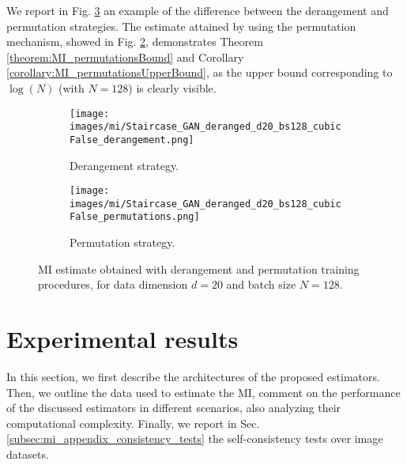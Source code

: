 We report in Fig. \ref{fig:MI_derangementVsPermutation} an example of the difference between the derangement and permutation strategies. The estimate attained by using the permutation mechanism, showed in Fig. \ref{fig:MI_permutations}, demonstrates Theorem \ref{theorem:MI_permutationsBound} and Corollary \ref{corollary:MI_permutationsUpperBound}, as the upper bound corresponding to $\log(N)$ (with $N=128$) is clearly visible. 

\begin{figure}
\centering
\begin{subfigure}{0.5\textwidth}
  \centering
  \texttt{[image: images/mi/Staircase\_GAN\_deranged\_d20\_bs128\_cubicFalse\_derangement.png]}
  \caption{Derangement strategy.}
  \label{fig:MI_derangement}
\end{subfigure}%
\begin{subfigure}{0.5\textwidth}
  \centering
  \texttt{[image: images/mi/Staircase\_GAN\_deranged\_d20\_bs128\_cubicFalse\_permutations.png]}
  \caption{Permutation strategy.}
  \label{fig:MI_permutations}
\end{subfigure}
\caption{MI estimate obtained with derangement and permutation training procedures, for data dimension $d=20$ and batch size $N=128$.}
\label{fig:MI_derangementVsPermutation}
\end{figure}


\section{Experimental results}
\label{sec:mi_results}
In this section, we first describe the architectures of the proposed estimators. Then, we outline the data used to estimate the MI, comment on the performance of the discussed estimators in different scenarios, also analyzing their computational complexity. Finally, we report in Sec. \ref{subsec:mi_appendix_consistency_tests} the self-consistency tests \cite{Song2020} over image datasets.

